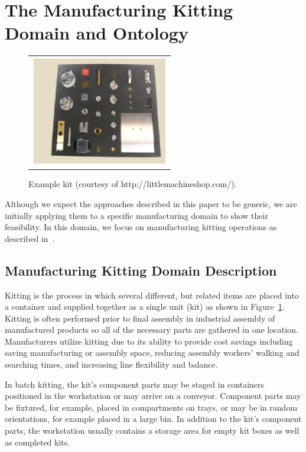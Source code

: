 \documentclass[final,1p,times]{elsarticle}
\begin{document}
\section{The Manufacturing Kitting Domain and Ontology}\label{S:section3}
\begin{figure}[t!h!]
\begin{center}
\begin{tabular}{c}
\includegraphics[width=6cm]{kit.eps}
\end{tabular}
\end{center}
\caption{Example kit (courtesy of http://littlemachineshop.com/).}
\label{fig:kit}
\end{figure}

Although we expect the approaches described in this paper to be generic, we are initially applying them to a specific manufacturing domain to show their feasibility. In this domain, we focus on manufacturing kitting operations as described in~\cite{Balakirsky.IROS.2012}.

\subsection{Manufacturing Kitting Domain Description}
Kitting is the process in which several different, but related items are placed into a container and supplied together as a single unit (kit) as shown in Figure~\ref{fig:kit}. Kitting is often performed prior to final assembly in industrial assembly of manufactured products so all of the necessary parts are gathered in one location. Manufacturers utilize kitting due to its ability to provide cost savings including saving manufacturing or assembly space, reducing assembly workers' walking and searching times, and increasing line flexibility and balance.


In batch kitting, the kit's component parts may be staged in containers positioned in the workstation or may arrive on a conveyor. Component parts may be fixtured, for example, placed in compartments on trays, or may be in random orientations, for example placed in a large bin. In addition to the kit's component parts, the workstation usually contains a storage area for empty kit boxes as well as completed kits.
\end{document}
